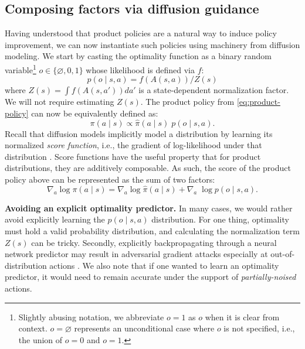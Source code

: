 \documentclass{article}
\begin{document}
\subsection{Composing factors via diffusion guidance}



Having understood that product policies are a natural way to induce policy improvement, we can now instantiate such policies using machinery from diffusion modeling. We start by casting the optimality function as a binary random variable\footnote{Slightly abusing notation, we abbreviate $o=1$ as $o$ when it is clear from context. $o=\varnothing$ represents an unconditional case where $o$ is not specified, i.e., the union of $o=0$ and $o=1$.} $o \in \{\varnothing,0, 1\}$ whose likelihood is defined via $f$:
\begin{equation}
    p(o \mid s,a) = f(A(s,a)) / Z(s)
\end{equation}
where $Z(s) = \int f(A(s,a'))da'$ is a state-dependent normalization factor. We will not require estimating $Z(s)$. The product policy from \cref{eq:product-policy} can now be equivalently defined as:
\begin{equation}
    \pi(a \mid s) \propto \hat{\pi}(a \mid s)\; p(o \mid s,a).
\end{equation}
Recall that diffusion models implicitly model a distribution by learning its normalized \textit{score function}, i.e., the gradient of log-likelihood under that distribution \citep{ncsn_song2019}.
Score functions have the useful property that for product distributions, they are additively composable. As such, the score of the product policy above can be represented as the sum of two factors:
\begin{equation}
    \nabla_a \log \pi(a \mid s) = \nabla_a \log \hat{\pi}(a \mid s) + \nabla_a \; \log p(o \mid s,a).
    \label{eq:factors}
\end{equation}


\textbf{Avoiding an explicit optimality predictor.} In many cases, we would rather avoid explicitly learning the $p(o \mid s,a)$ distribution. For one thing, optimality must hold a valid probability distribution, and calculating the normalization term $Z(s)$ can be tricky. Secondly, explicitly backpropagating through a neural network predictor may result in adversarial gradient attacks \citep{adversarial_goodfellow2015} especially at out-of-distribution actions \citep{iql_kostrikov2022, cql_kumar2020}. We also note that if one wanted to learn an optimality predictor, it would need to remain accurate under the support of \textit{partially-noised} actions.
\end{document}
